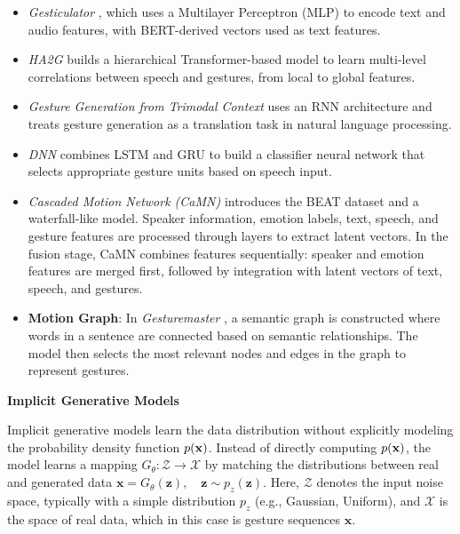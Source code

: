 \begin{itemize}
	\item \textit{Gesticulator} \cite{kucherenko2020gesticulator}, which uses a Multilayer Perceptron (MLP) to encode text and audio features, with BERT-derived vectors used as text features.
	
	\item \textit{HA2G} \cite{liu2022learning} builds a hierarchical Transformer-based model to learn multi-level correlations between speech and gestures, from local to global features.
	
	\item \textit{Gesture Generation from Trimodal Context} \cite{yoon2020speech} uses an RNN architecture and treats gesture generation as a translation task in natural language processing.
	
	\item \textit{DNN} \cite{chiu2015predicting} combines LSTM and GRU to build a classifier neural network that selects appropriate gesture units based on speech input.
	
	\item \textit{Cascaded Motion Network (CaMN)} \cite{liu2022beat} introduces the BEAT dataset and a waterfall-like model. Speaker information, emotion labels, text, speech, and gesture features are processed through layers to extract latent vectors. In the fusion stage, CaMN combines features sequentially: speaker and emotion features are merged first, followed by integration with latent vectors of text, speech, and gestures.
	
	\item \textbf{Motion Graph}: In \textit{Gesturemaster} \cite{zhou2022gesturemaster}, a semantic graph is constructed where words in a sentence are connected based on semantic relationships. The model then selects the most relevant nodes and edges in the graph to represent gestures.
\end{itemize}


\textbf{Implicit Generative Models}
\label{sec:ImplicitGenerativeModels}

Implicit generative models learn the data distribution without explicitly modeling the probability density function $p(\mathbf{x})$. Instead of directly computing $p(\mathbf{x})$, the model learns a mapping $G_{\theta}: \mathcal{Z} \to \mathcal{X}$ by matching the distributions between real and generated data $\mathbf{x} = G_\theta(\mathbf{z}), \quad \mathbf{z} \sim p_z(\mathbf{z})$. Here, $\mathcal{Z}$ denotes the input noise space, typically with a simple distribution \(p_{z}\) (e.g., Gaussian, Uniform), and \(\mathcal{X}\) is the space of real data, which in this case is gesture sequences \(\mathbf{x}\).

